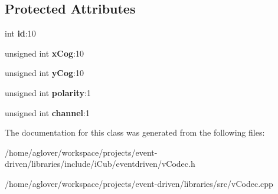 \subsection*{Protected Attributes}
\begin{DoxyCompactItemize}
\item 
int {\bfseries id}\+:10\hypertarget{classev_1_1ClusterEvent_a0c4a2883f902f1a2b3fb025a7b8cb37d}{}\label{classev_1_1ClusterEvent_a0c4a2883f902f1a2b3fb025a7b8cb37d}

\item 
unsigned int {\bfseries x\+Cog}\+:10\hypertarget{classev_1_1ClusterEvent_a93c5012538e0a5aaaba820dea4e28c63}{}\label{classev_1_1ClusterEvent_a93c5012538e0a5aaaba820dea4e28c63}

\item 
unsigned int {\bfseries y\+Cog}\+:10\hypertarget{classev_1_1ClusterEvent_ad5b3c4bb36d8aedbeed1624e27bc9716}{}\label{classev_1_1ClusterEvent_ad5b3c4bb36d8aedbeed1624e27bc9716}

\item 
unsigned int {\bfseries polarity}\+:1\hypertarget{classev_1_1ClusterEvent_ad66f5bf0d73bdbd4900609b42b8d0040}{}\label{classev_1_1ClusterEvent_ad66f5bf0d73bdbd4900609b42b8d0040}

\item 
unsigned int {\bfseries channel}\+:1\hypertarget{classev_1_1ClusterEvent_a28dfff3ae10a96e2a49981993be962d1}{}\label{classev_1_1ClusterEvent_a28dfff3ae10a96e2a49981993be962d1}

\end{DoxyCompactItemize}


The documentation for this class was generated from the following files\+:\begin{DoxyCompactItemize}
\item 
/home/aglover/workspace/projects/event-\/driven/libraries/include/i\+Cub/eventdriven/v\+Codec.\+h\item 
/home/aglover/workspace/projects/event-\/driven/libraries/src/v\+Codec.\+cpp\end{DoxyCompactItemize}
